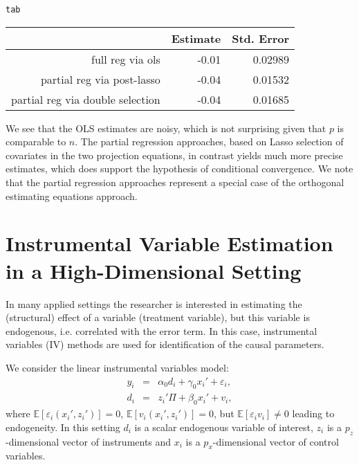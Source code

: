 \documentclass{amsart}\usepackage[]{graphicx}\usepackage[]{color}
\makeatletter
\newcommand{\hlstd}[1]{\textcolor[rgb]{0.345,0.345,0.345}{#1}}%
\newenvironment{kframe}{%
 \def\at@end@of@kframe{}%
 \ifinner\ifhmode%
  \def\at@end@of@kframe{\end{minipage}}%
  \begin{minipage}{\columnwidth}%
 \fi\fi%
 \def\FrameCommand##1{\hskip\@totalleftmargin \hskip-\fboxsep
 \colorbox{shadecolor}{##1}\hskip-\fboxsep
     \hskip-\linewidth \hskip-\@totalleftmargin \hskip\columnwidth}%
 \MakeFramed {\advance\hsize-\width
   \@totalleftmargin\z@ \linewidth\hsize
   \@setminipage}}%
 {\par\unskip\endMakeFramed%
 \at@end@of@kframe}
\makeatother
\begin{document}
\begin{kframe}
\begin{alltt}
\hlstd{tab}
\end{alltt}
\end{kframe}%
\begin{table}[ht]
\centering
\begin{tabular}{rrr}
  \hline
 & Estimate & Std. Error \\ 
  \hline
full reg via ols & -0.01 & 0.02989 \\ 
  partial reg
via post-lasso  & -0.04 & 0.01532 \\ 
  partial reg via double selection & -0.04 & 0.01685 \\ 
   \hline
\end{tabular}
\end{table}


We see that the OLS estimates are noisy, which is not surprising given that $p$ is comparable to $n$.  The partial regression approaches, based on Lasso selection of covariates in the two projection equations, in contrast yields much more precise estimates, which does support the hypothesis of conditional convergence.  We note that the partial regression approaches represent a special case of the orthogonal estimating equations approach.

\section{Instrumental Variable Estimation in a High-Dimensional Setting}

In many applied settings the researcher is interested in estimating the (structural) effect of a variable (treatment variable), but this variable is endogenous, i.e. correlated with the error term. In this case, instrumental variables (IV) methods are used for identification of the causal parameters.

We consider the linear instrumental variables model:
\begin{eqnarray}
y_i &=& \alpha_0 d_i + \gamma_0 x_i' + \varepsilon_i,\\
d_i &=& z_i' \Pi + \beta_0 x_i' + v_i,
\end{eqnarray}
where $\mathbb{E}[\varepsilon_i (x_i', z_i')]= 0$, $\mathbb{E}[v_i (x_i', z_i')]=0$, but $\mathbb{E}[\varepsilon_i v_i] \neq 0$ leading to endogeneity. In this setting $d_i$ is a scalar endogenous variable of interest, $z_i$ is a $p_z$-dimensional vector of instruments and $x_i$ is a $p_x$-dimensional vector of control variables.
\end{document}

